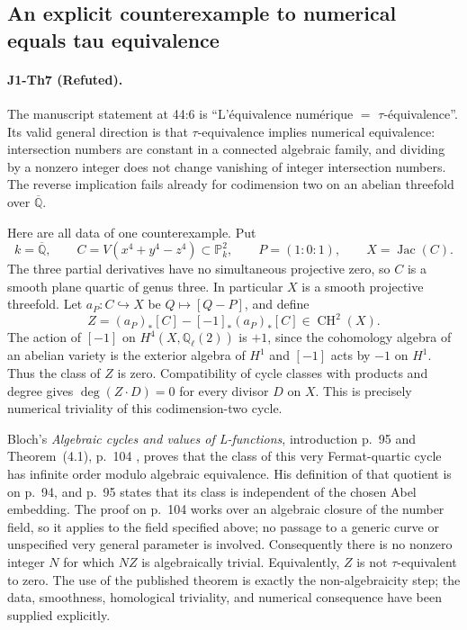 \subsection{An explicit counterexample to numerical equals tau equivalence}
\paragraph{J1-Th7 (Refuted).}
The manuscript statement at 44:6 is
``L'équivalence numérique $=$ $\tau$-équivalence''.
Its valid general direction is that $\tau$-equivalence implies
numerical equivalence: intersection numbers are constant in a
connected algebraic family, and dividing by a nonzero integer
does not change vanishing of integer intersection numbers.
The reverse implication fails already for codimension two on
an abelian threefold over $\overline{\mathbb Q}$.

Here are all data of one counterexample.  Put
\[
 k=\overline{\mathbb Q},\qquad
 C=V(x^4+y^4-z^4)\subset\mathbb P^2_k,\qquad
 P=(1:0:1),\qquad X=\operatorname{Jac}(C).
\]
The three partial derivatives have no simultaneous projective
zero, so $C$ is a smooth plane quartic of genus three.  In
particular $X$ is a smooth projective threefold.  Let
$a_P:C\hookrightarrow X$ be $Q\mapsto[Q-P]$, and define
\[
 Z=(a_P)_*[C]-[-1]_* (a_P)_*[C]\in\operatorname{CH}^2(X).
\]
The action of $[-1]$ on $H^4(X,\mathbb Q_\ell(2))$ is $+1$,
since the cohomology algebra of an abelian variety is the
exterior algebra of $H^1$ and $[-1]$ acts by $-1$ on $H^1$.
Thus the class of $Z$ is zero.  Compatibility of cycle classes
with products and degree gives $\deg(Z\cdot D)=0$ for every
divisor $D$ on $X$.  This is precisely numerical triviality
of this codimension-two cycle.

Bloch's \emph{Algebraic cycles and values of L-functions},
introduction p.~95 and Theorem~(4.1), p.~104
\cite{DGJ_Bloch1984}, proves that the class of this very
Fermat-quartic cycle has infinite order modulo algebraic
equivalence.  His definition of that quotient is on p.~94,
and p.~95 states that its class is independent of the chosen
Abel embedding.  The proof on p.~104 works over an algebraic
closure of the number field, so it applies to the field specified
above; no passage to a generic curve or unspecified very general
parameter is involved.  Consequently there is no nonzero integer
$N$ for which $NZ$ is algebraically trivial.  Equivalently,
$Z$ is not $\tau$-equivalent to zero.  The use of the published
theorem is exactly the non-algebraicity step; the data,
smoothness, homological triviality, and numerical consequence
have been supplied explicitly.

